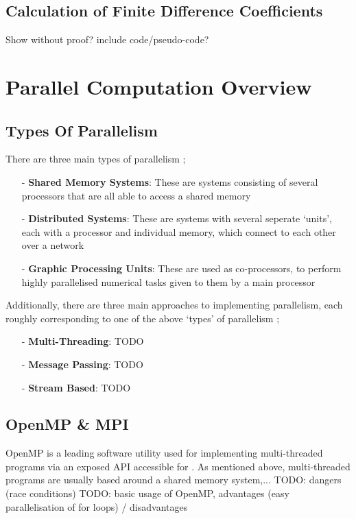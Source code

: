 \subsection{Calculation of Finite Difference Coefficients}
Show without proof?
include code/pseudo-code?

\section{Parallel Computation Overview}
\subsection{Types Of Parallelism}
There are three main types of parallelism \cite{IntroToParComp};
\begin{itemize}
	\item[-]{\textbf{Shared Memory Systems}: These are systems consisting of several processors that are all able to access a shared memory}
	\item[-]{\textbf{Distributed Systems}: These are systems with several seperate `units', each with a processor and individual memory, which connect to each other over a network}
	\item[-]{\textbf{Graphic Processing Units}: These are used as co-processors, to perform highly parallelised numerical tasks given to them by a main processor}
\end{itemize}

Additionally, there are three main approaches to implementing parallelism, each roughly corresponding to one of the above `types' of parallelism \cite{IntroToParComp};
\begin{itemize}
	\item[-]{\textbf{Multi-Threading}: TODO}
	\item[-]{\textbf{Message Passing}: TODO}
	\item[-]{\textbf{Stream Based}: TODO}
\end{itemize}


\subsection{OpenMP \& MPI}
OpenMP is a leading software utility used for implementing multi-threaded programs via an exposed API accessible for . As mentioned above, multi-threaded programs are usually based around a shared memory system,...
TODO: dangers (race conditions)
TODO: basic usage of OpenMP, advantages (easy parallelisation of for loops) / disadvantages

